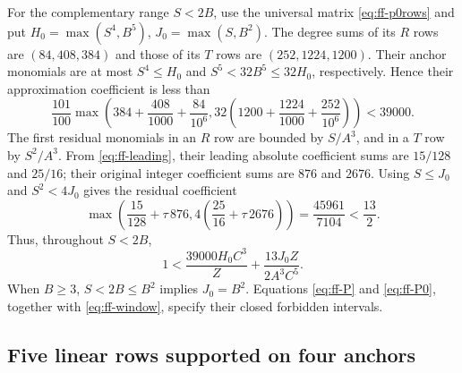 \documentclass[12pt]{article}
\numberwithin{equation}{section}
\begin{document}
For the complementary range $S<2B$, use the universal matrix
\eqref{eq:ff-p0rows} and put
$H_0=\max(S^4,B^5)$, $J_0=\max(S,B^2)$.
The degree sums of its $R$ rows are $(84,408,384)$ and those of its
$T$ rows are $(252,1224,1200)$. Their anchor monomials are at most
$S^4\le H_0$ and $S^5<32B^5\le32H_0$, respectively. Hence their
approximation coefficient is less than
\[
 \frac{101}{100}\max\left(384+\frac{408}{1000}+\frac{84}{10^6},
 32\left(1200+\frac{1224}{1000}+\frac{252}{10^6}\right)\right)
 <39000.
\]
The first residual monomials in an $R$ row are bounded by $S/A^3$,
and in a $T$ row by $S^2/A^3$. From \eqref{eq:ff-leading}, their
leading absolute coefficient sums are $15/128$ and $25/16$; their
original integer coefficient sums are $876$ and $2676$.
Using $S\le J_0$ and $S^2<4J_0$ gives the residual coefficient
\[
 \max\left(\frac{15}{128}+\tau\,876,
       4\left(\frac{25}{16}+\tau\,2676\right)\right)
 =\frac{45961}{7104}<\frac{13}{2}.
\]
Thus, throughout $S<2B$,
\begin{equation}\label{eq:ff-P0}
 1<\frac{39000H_0C^3}{Z}+\frac{13J_0Z}{2A^3C^5}.
\end{equation}
When $B\ge3$, $S<2B\le B^2$ implies $J_0=B^2$.
Equations \eqref{eq:ff-P} and \eqref{eq:ff-P0}, together with
\eqref{eq:ff-window}, specify their closed forbidden intervals.

\subsection{Five linear rows supported on four anchors}
\end{document}
